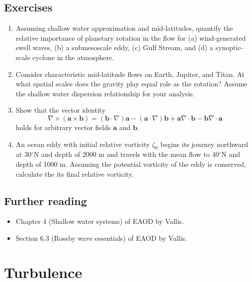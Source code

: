 \documentclass[12pt]{article}
\numberwithin{equation}{section}
\numberwithin{figure}{section}
\numberwithin{table}{section}
\begin{document}
\subsection{Exercises}

\begin{enumerate}
  \item Assuming shallow water approximation and mid-latitudes, quantify the
  relative importance of planetary rotation in the flow for (a) wind-generated
  swell waves, (b) a submesoscale eddy, (c) Gulf Stream, and (d) a synoptic-scale
  cyclone in the atmosphere.
  \item Consider characteristic mid-latitude flows on Earth, Jupiter, and Titan.
  At what spatial scales does the gravity play equal role as the rotation?
  Assume the shallow water dispersion relationship for your analysis.
  \item Show that the vector identity
  \begin{equation}
    \nabla \times (\mathbf{a} \times \mathbf{b}) =
    (\mathbf{b} \cdot \nabla) \mathbf{a} - (\mathbf{a} \cdot \nabla) \mathbf{b} +
    \mathbf{a} \nabla \cdot \mathbf{b} - \mathbf{b} \nabla \cdot \mathbf{a}
  \end{equation}
  holds for arbitrary vector fields $\mathbf{a}$ and $\mathbf{b}$.
  \item An ocean eddy with initial relative vorticity $\zeta_0$ begins its
  journey northward at 30$^\circ$N and depth of 2000 m and travels with the
  mean flow to 40$^\circ$N and depth of 1000 m.
  Assuming the potential vorticity of the eddy is conserved, calculate the its
  final relative vorticity.
\end{enumerate}

\subsection*{Further reading}

\begin{itemize}
  \item Chapter 4 (Shallow water systems) of EAOD by Vallis.
  \item Section 6.3 (Rossby wave essentials) of EAOD by Vallis.
\end{itemize}

\newpage
\section{Turbulence}
\label{sec:turbulence}
\end{document}
